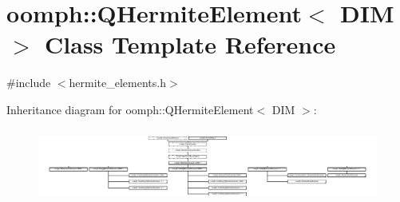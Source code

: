 \hypertarget{classoomph_1_1QHermiteElement}{}\section{oomph\+:\+:Q\+Hermite\+Element$<$ D\+IM $>$ Class Template Reference}
\label{classoomph_1_1QHermiteElement}


{\ttfamily \#include $<$hermite\+\_\+elements.\+h$>$}

Inheritance diagram for oomph\+:\+:Q\+Hermite\+Element$<$ D\+IM $>$\+:\begin{figure}[H]
\begin{center}
\leavevmode
\includegraphics[height=2.456140cm]{classoomph_1_1QHermiteElement}
\end{center}
\end{figure}
